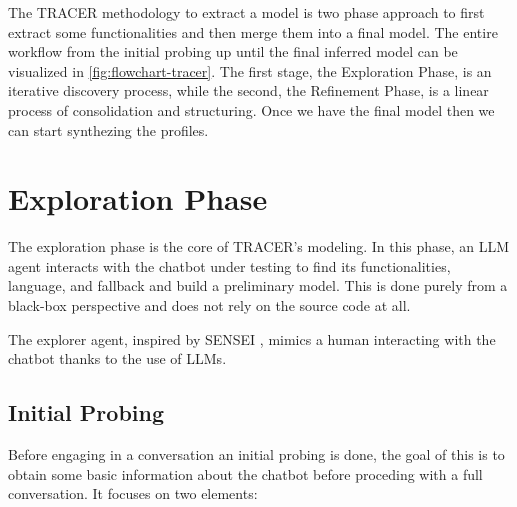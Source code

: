 The \ac{TRACER} methodology to extract a model is two phase approach
to first extract some functionalities and then merge them into a final model.
The entire workflow from the initial probing up until the final inferred model
can be visualized in \autoref{fig:flowchart-tracer}.
The first stage, the Exploration Phase, is an iterative discovery process,
while the second, the Refinement Phase, is a linear process of consolidation and structuring.
Once we have the final model then we can start synthezing the profiles.


\section{Exploration Phase}\label{sec:exploration}

The exploration phase is the core of \ac{TRACER}'s modeling.
In this phase, an \ac{LLM} agent interacts with the chatbot under testing
to find its functionalities, language, and fallback
and build a preliminary model.
This is done purely from a black-box perspective
and does not rely on the source code at all.

The explorer agent, inspired by SENSEI
\autocite{delaraSensei, delaraAutomatedEndtoEndTesting2025},
mimics a human interacting with the chatbot
thanks to the use of \acp{LLM}.



\subsection{Initial Probing}

Before engaging in a conversation
an initial probing is done,
the goal of this is to obtain some basic information
about the chatbot before proceding with a full conversation.
It focuses on two elements:

